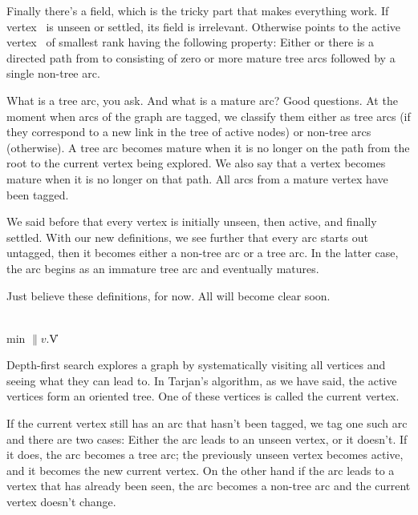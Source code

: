 Finally there's a  field, which is the tricky part that makes
everything work. If vertex~ is unseen or settled, its 
field is
irrelevant. Otherwise  points to the active vertex~
of smallest rank having the following property:
Either  or there is a directed path from  to 
consisting of
zero or more mature tree arcs followed by a single non-tree arc.

What is a tree arc, you ask. And what is a mature arc? Good questions. At the
moment when arcs of the graph are tagged, we classify them either as tree
arcs (if they correspond to a new  link in the tree of active
nodes) or non-tree arcs (otherwise). A tree arc becomes mature when it
is no longer on the path from the root to the current vertex being
explored. We also say that a vertex becomes mature when it is
no longer on that path. All arcs from a mature vertex have been tagged.

We said before that every vertex is initially unseen, then active, and
finally settled. With our new definitions, we see further that every arc starts
out untagged, then it becomes either a non-tree arc or a tree arc. In the
latter case, the arc begins as an immature tree arc and eventually matures.

Just believe these definitions, for now. All will become clear soon.

\Y\B\4\D\\{min}\5
$\|v.{}$\|V\par
\fi

Depth-first search explores a graph by systematically visiting all
vertices and seeing what they can lead to. In Tarjan's algorithm, as
we have said, the active vertices form an oriented tree. One of these
vertices is called the current vertex.

If the current vertex still has an arc that hasn't been tagged, we
tag one such arc and there are two cases: Either the arc leads to
an unseen vertex, or it doesn't. If it does, the arc becomes a tree
arc; the previously unseen vertex becomes active, and it becomes the
new current vertex.  On the other hand if the arc leads to a vertex
that has already been seen, the arc becomes a non-tree arc and the
current vertex doesn't change.

